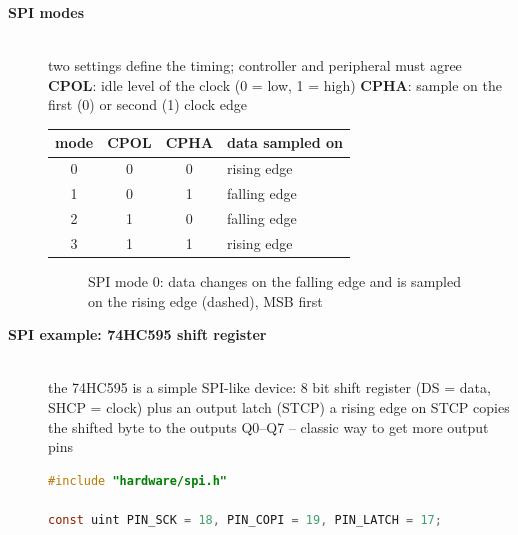 \begin{description}
\item[{\rot\bf SPI modes}]~\\[-\lblskip]
\bi
	\ite two settings define the timing; controller and peripheral must agree
	\bi
		\ite \textbf{CPOL}: idle level of the clock (0 = low, 1 = high)
		\ite \textbf{CPHA}: sample on the first (0) or second (1) clock edge
	\ei
\ei
\begin{center}
\begin{tabular}{|c|c|c|l|}
\hline
\textbf{mode} & \textbf{CPOL} & \textbf{CPHA} & \textbf{data sampled on} \\
\hline
0 & 0 & 0 & rising edge \\
1 & 0 & 1 & falling edge \\
2 & 1 & 0 & falling edge \\
3 & 1 & 1 & rising edge \\
\hline
\end{tabular}
\end{center}
\begin{figure}[!hbtp]
\begin{center}
\caption{SPI mode 0: data changes on the falling edge and is sampled on the rising edge (dashed), MSB first}
\end{center}
\end{figure}
\os{\newpage}

\item[{\rot\bf SPI example: 74HC595 shift register}]~\\[-\lblskip]
\bi
	\ite the 74HC595 is a simple SPI-like device: 8 bit shift register (DS = data, SHCP = clock) plus an output latch (STCP)
	\ite a rising edge on STCP copies the shifted byte to the outputs Q0--Q7 -- classic way to get more output pins
\ei
\begin{lstlisting}[language=C]
#include "hardware/spi.h"

const uint PIN_SCK = 18, PIN_COPI = 19, PIN_LATCH = 17;


\end{lstlisting}
\end{description}
